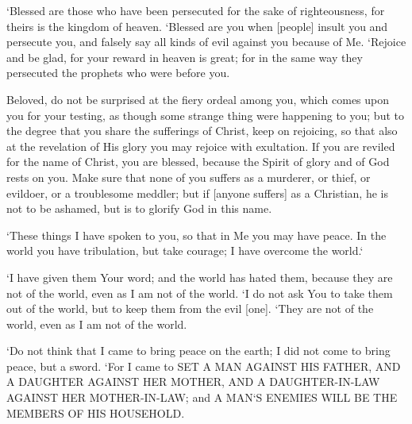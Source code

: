 \begin{scripture}[Matthew 5:10-12]
    `Blessed are those who have been persecuted for the sake of righteousness, for theirs is the kingdom of heaven.
    `Blessed are you when [people] insult you and persecute you, and falsely say all kinds of evil against you because of Me.
    `Rejoice and be glad, for your reward in heaven is great; for in the same way they persecuted the prophets who were before you.
\end{scripture}

\begin{scripture}[1 Peter 4:12-16]
    Beloved, do not be surprised at the fiery ordeal among you, which comes upon you for your testing, as though some strange thing were happening to you;
    but to the degree that you share the sufferings of Christ, keep on rejoicing, so that also at the revelation of His glory you may rejoice with exultation.
    If you are reviled for the name of Christ, you are blessed, because the Spirit of glory and of God rests on you.
    Make sure that none of you suffers as a murderer, or thief, or evildoer, or a troublesome meddler;
    but if [anyone suffers] as a Christian, he is not to be ashamed, but is to glorify God in this name.
\end{scripture}

\begin{scripture}[John 16:33]
    `These things I have spoken to you, so that in Me you may have peace. In the world you have tribulation, but take courage; I have overcome the world.`
\end{scripture}

\begin{scripture}[John 17:14-16]
    `I have given them Your word; and the world has hated them, because they are not of the world, even as I am not of the world.
    `I do not ask You to take them out of the world, but to keep them from the evil [one].
    `They are not of the world, even as I am not of the world.
\end{scripture}

\begin{scripture}[Matthew 10:34-36]
    `Do not think that I came to bring peace on the earth; I did not come to bring peace, but a sword.
    `For I came to SET A MAN AGAINST HIS FATHER, AND A DAUGHTER AGAINST HER MOTHER, AND A DAUGHTER-IN-LAW AGAINST HER MOTHER-IN-LAW;
    and A MAN`S ENEMIES WILL BE THE MEMBERS OF HIS HOUSEHOLD.
\end{scripture}

